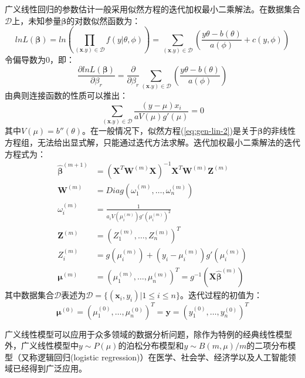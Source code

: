 \documentclass[a4paper]{ctexart}
\begin{document}
\begin{spacing}{1.3}
	广义线性回归的参数估计一般采用似然方程的迭代加权最小二乘解法。在数据集合$\mathcal{D}$上，未知参量$\bm\beta$的对数似然函数为：
	\begin{equation}
	ln L(\bm\beta)=ln\left(\prod_{(\bm x.y)\in\mathcal{D}}f(y|\theta,\phi)\right)=\sum_{(\bm x.y)\in\mathcal{D}}\left(\frac{y\theta-b(\theta)}{a(\phi)}+c(y,\phi)\right)
	\end{equation}
	令偏导数为0，即：
	\begin{equation}
	\frac{\partial lnL(\bm\beta)}{\partial \beta_r}=\frac{\partial}{\partial\beta_r}\sum_{(\bm x.y)\in\mathcal{D}}\left(\frac{y\theta-b(\theta)}{a(\phi)}\right)
	\end{equation}
	由典则连接函数的性质可以推出\cite{RN92}：
	\begin{equation}\label{eq:gen-lin-2}
	\sum_{(\bm x.y)\in\mathcal{D}}\frac{(y-\mu)x_i}{aV(\mu)g'(\mu)}=0
	\end{equation}
	其中$V(\mu)=b''(\theta)$。在一般情况下，似然方程(\ref{eq:gen-lin-2})是关于$\bm\beta$的非线性方程组，无法给出显式解，只能通过迭代方法求解。迭代加权最小二乘解法的迭代方程式为\cite{RN92}：
	\begin{equation}
	\begin{split}
	\hat{\bm\beta}^{(m+1)}&=\left(\bm X^T \bm W^{(m)}\bm X\right)^{-1}\bm X^T\bm W^{(m)}\bm Z^{(m)}\\
	\bm W^{(m)}&=Diag(\omega_1^{(m)},\dots,\omega_n^{(m)})\\
	\omega_i^{(m)}&=\frac{1}{a_iV(\mu_i^{(m)})g'(\mu_i^{(m)})^2}\\
	\bm Z^{(m)}&=(Z_1^{(m)},\dots,Z_n^{(m)})^T\\
	Z_i^{(m)}&=g(\mu_i^{(m)})+\left(y_i-\mu_i^{(m)}\right)g'\left(\mu_i^{(m)}\right)\\
	\bm\mu^{(m)}&=(\mu_1^{(m)},\dots,\mu_n^{(m)})^T=g^{-1}(\bm X\hat{\bm \beta}^{(m)})
	\end{split}
	\end{equation}
	其中数据集合$\mathcal{D}$表述为$\mathcal{D}=\{(\bm x_i,y_i)|1\le i\le n\}$。迭代过程的初值为\cite{RN92}：
	\begin{equation}
	\bm\mu^{(0)}=(\mu_1^{(0)},\dots,\mu_n^{(0)})^T=\bm y=(y_1^{(0)},\dots,y_n^{(0)})^T
	\end{equation}
	
	广义线性模型可以应用于众多领域的数据分析问题，除作为特例的经典线性模型外，广义线性模型中$y\sim P(\mu)$的泊松分布模型和$y\sim B(m,\mu)/m$的二项分布模型（又称逻辑回归(logistic regression)）在医学、社会学、经济学以及人工智能领域已经得到广泛应用。
	

\end{spacing}
\end{document}
